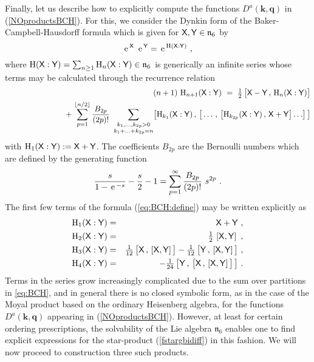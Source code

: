 \documentclass[11pt,a4paper]{article}
\newcommand{\cb}[2]{\left[#1,#2\right]}                 %
\newcommand{\mbf}[1]{{\boldsymbol {#1} }}
\def\X{{\sf X}}
\def\Y{{\sf Y}}
\def\mk{{\mbf k}}
\def\mq{{\mbf q}}
\def\mfn{{\mathfrak n}}
\def\e{{\,\rm e}\,}
\begin{document}
Finally, let us describe how to explicitly compute the functions
$D^a(\mk,\mq)$ in (\ref{NOproductsBCH}). For this, we consider the
Dynkin form of the Baker-Campbell-Hausdorff formula which is given for
$\X,\Y\in\mfn_6$ by
\begin{equation}
  \label{eq:BCH:define}
\e^\X~\e^\Y=\e^{\mathrm{H}(\X:\Y)} \ ,
\end{equation}
where $\mathrm{H}(\X:\Y)=\sum_{n\geq1}\mathrm{H}_n(\X:\Y)\in\mfn_6$ is
generically an infinite series whose terms may be calculated through the
recurrence relation
\begin{eqnarray}
  \label{eq:BCH}
&&(n+1)~\mathrm{H}_{n+1}(\X:\Y)~=~\mbox{$\frac 12$}\,\bigl[\X-\Y\,,\,
\mathrm{H}_n(\X:\Y)\bigr]
\nonumber  \\ &&~~~~~~~~~~~~~~~~~~~~
+\,\sum_{p=1}^{\lfloor n/2\rfloor}\frac{B_{2p}}{(2p)!}~
\sum_{\substack{k_1,\ldots,k_{2p}> 0 \\ k_1+\ldots+k_{2p}=n }}
\bigl[\mathrm{H}_{k_1}(\X:\Y)\,,\,\bigl[\,\ldots\,,\,\bigl[
\mathrm{H}_{k_{2p}}(\X:\Y)\,,\,\X+\Y\bigr]\ldots\bigr]\,\bigr]\nonumber\\
\end{eqnarray}
with $\mathrm{H}_1(\X:\Y):=\X+\Y$. The coefficients $B_{2p}$ are the
Bernoulli numbers which are defined by the generating function
\begin{equation}
  \label{eq:BCH:K}
  \frac{s}{1-\e^{-s}}-\frac s2-1=\sum_{p=1}^\infty\frac{B_{2p}}{(2p)!}
  ~s^{2p} \ .
\end{equation}
The first few terms of the formula (\ref{eq:BCH:define}) may be
written explicitly as
\begin{eqnarray}
  \label{eq:BCH:1}
  \mathrm{H}_1(\X:\Y)&=& \X+\Y \ , \nonumber\\
  \mathrm{H}_2(\X:\Y)&=&\mbox{$\frac 12$}\,\cb \X\Y \ , \nonumber \\
  \mathrm{H}_3(\X:\Y)&=&\mbox{$\frac 1{12}$}\,\bigl[\X\,,\,\cb \X\Y\,\bigr]
  -\mbox{$\frac 1{12}$}\,\bigl[\Y\,,\,\cb \X\Y\,\bigr] \ , \nonumber\\
  \mathrm{H}_4(\X:\Y)&=& -\mbox{$\frac 1{24}$}\,\bigl[\Y\,,\,\bigl[\X
  \,,\,\cb \X\Y\,\bigr]\,\bigr] \ .
\end{eqnarray}
Terms in the series grow increasingly complicated due to
the sum over partitions in \eqref{eq:BCH}, and in general there is no
closed symbolic form, as in the case of the Moyal product based on the
ordinary Heisenberg algebra, for the functions $D^a(\mk,\mq)$ appearing in
(\ref{NOproductsBCH}). However, at least for certain ordering
prescriptions, the solvability of the Lie algebra $\mfn_6$ enables one
to find explicit expressions for the star-product (\ref{fstargbidiff})
in this fashion. We will now proceed to construction three such
products.
\end{document}
